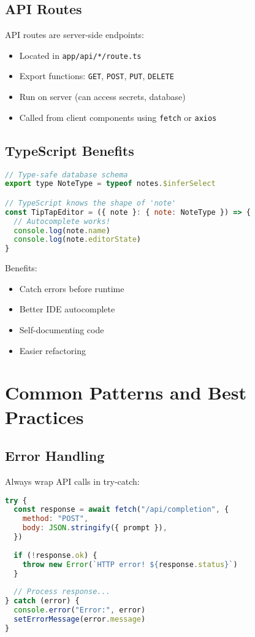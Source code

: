 \documentclass[11pt,a4paper]{article}
\begin{document}
\subsection{API Routes}

API routes are server-side endpoints:
\begin{itemize}
    \item Located in \texttt{app/api/*/route.ts}
    \item Export functions: \texttt{GET}, \texttt{POST}, \texttt{PUT}, \texttt{DELETE}
    \item Run on server (can access secrets, database)
    \item Called from client components using \texttt{fetch} or \texttt{axios}
\end{itemize}

\subsection{TypeScript Benefits}

\begin{lstlisting}[language=JavaScript]
// Type-safe database schema
export type NoteType = typeof notes.$inferSelect

// TypeScript knows the shape of 'note'
const TipTapEditor = ({ note }: { note: NoteType }) => {
  // Autocomplete works!
  console.log(note.name)
  console.log(note.editorState)
}
\end{lstlisting}

Benefits:
\begin{itemize}
    \item Catch errors before runtime
    \item Better IDE autocomplete
    \item Self-documenting code
    \item Easier refactoring
\end{itemize}


\section{Common Patterns and Best Practices}

\subsection{Error Handling}

Always wrap API calls in try-catch:

\begin{lstlisting}[language=JavaScript]
try {
  const response = await fetch("/api/completion", {
    method: "POST",
    body: JSON.stringify({ prompt }),
  })
  
  if (!response.ok) {
    throw new Error(`HTTP error! ${response.status}`)
  }
  
  // Process response...
} catch (error) {
  console.error("Error:", error)
  setErrorMessage(error.message)
}
\end{lstlisting}
\end{document}
